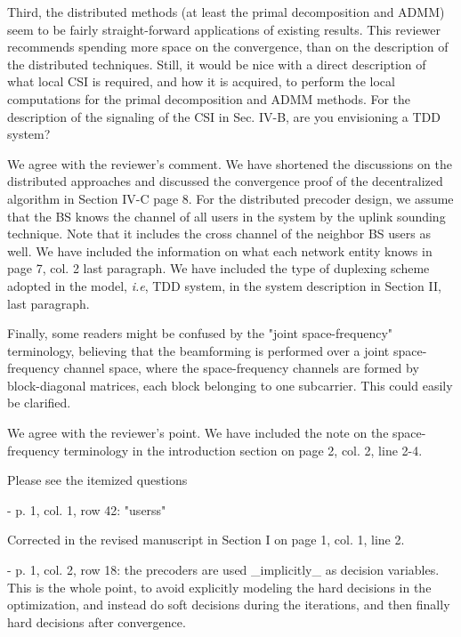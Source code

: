\begin{itemize}
 Third, the distributed methods (at least the primal decomposition and ADMM) seem to be fairly straight-forward applications of existing results. This reviewer recommends spending more space on the convergence, than on the description of the distributed techniques. Still, it would be nice with a direct description of what local CSI is required, and how it is acquired, to perform the local computations for the primal decomposition and ADMM methods. For the description of the signaling of the CSI in Sec. IV-B, are you envisioning a TDD system?

\resp We agree with the reviewer's comment. We have shortened the discussions on the distributed approaches and discussed the convergence proof of the decentralized algorithm in Section IV-C page 8. For the distributed precoder design, we assume that the \ac{BS}  knows the channel  of all users in the system by the uplink sounding technique. Note that it includes the cross channel of the neighbor BS users as well. We have included the information on what each network entity knows in page 7, col. 2 last paragraph. We have included the type of duplexing scheme adopted in the model, \textit{i.e}, TDD system, in the system description in Section II, last paragraph.

 Finally, some readers might be confused by the "joint space-frequency" terminology, believing that the beamforming is performed over a joint space-frequency channel space, where the space-frequency channels are formed by block-diagonal matrices, each block belonging to one subcarrier. This could easily be clarified. 

\resp We agree with the reviewer's point. We have included the note on the space-frequency terminology in the introduction section on page 2, col. 2, line 2-4.

 Please see the itemized questions

\begin{itemize}

 - p. 1, col. 1, row 42: "userss"

\resp Corrected in the revised manuscript in Section I on page 1, col. 1, line 2.

 - p. 1, col. 2, row 18: the precoders are used \_implicitly\_ as decision variables. This is the whole point, to avoid explicitly modeling the hard decisions in the optimization, and instead do soft decisions during the iterations, and then finally hard decisions after convergence.


\end{itemize}
\end{itemize}
